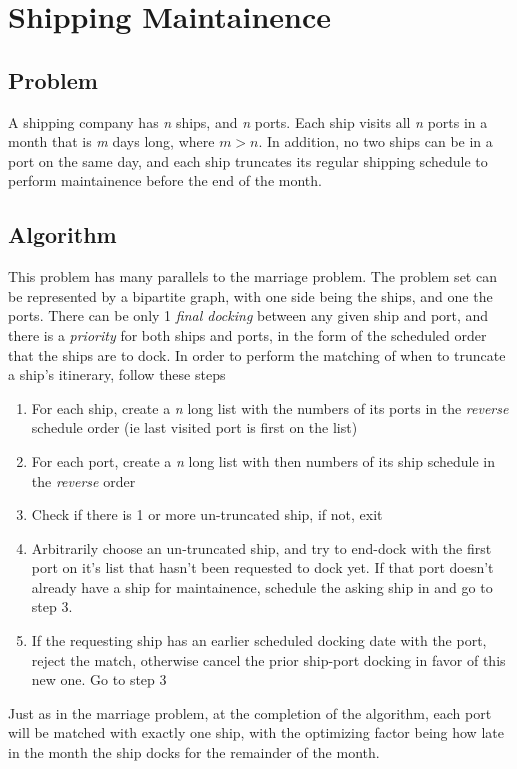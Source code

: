 \documentclass[titlepage]{article}
\numberwithin{equation}{subsection}
\begin{document}
\section{Shipping Maintainence}
\subsection{Problem}
A shipping company has \textit{n} ships, and \textit{n} ports. Each ship
visits all \textit{n} ports in a month that is \textit{m} days long, where
$m>n$. In addition, no two ships can be in a port on the same day, and each
ship truncates its regular shipping schedule to perform maintainence before
the end of the month.
\subsection{Algorithm}
This problem has many parallels to the marriage problem. The problem set can
be represented by a bipartite graph, with one side being the ships, and one the
ports. There can be only 1 \textit{final docking} between any given ship and port,
and there is a \textit{priority} for both ships and ports, in the form of the 
scheduled order that the ships are to dock. In order to perform the matching of when to truncate
a ship's itinerary, follow these steps
\begin{enumerate}
    \item For each ship, create a \textit{n} long list with the numbers of its ports in the \textit{reverse} schedule order (ie last visited port is first on the list)
    \item For each port, create a \textit{n} long list with then numbers of its ship schedule in the \textit{reverse} order
    \item Check if there is 1 or more un-truncated ship, if not, exit
    \item Arbitrarily choose an un-truncated ship, and try to end-dock with the first port on it's list that hasn't been requested to dock yet. If that port doesn't already have a ship for maintainence, schedule the asking ship in and go to step 3.
    \item If the requesting ship has an earlier scheduled docking date with the port, reject the match, otherwise cancel the prior ship-port docking in favor of this new one. Go to step 3
\end{enumerate}
Just as in the marriage problem, at the completion of the algorithm, each port will be matched with exactly one ship, with the 
optimizing factor being how late in the month the ship docks for the remainder of the month.
\end{document}
